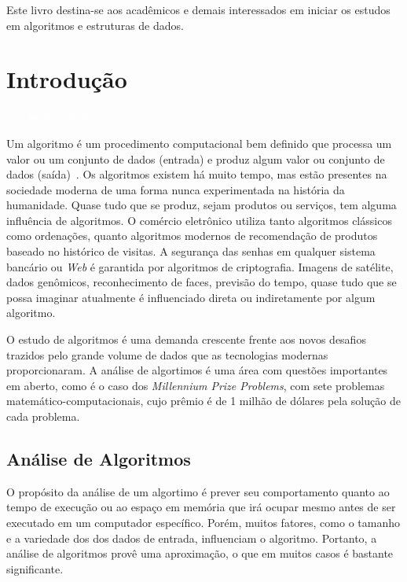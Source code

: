 \documentclass[11pt,fleqn]{book} %
\begin{document}

Este livro destina-se aos acadêmicos e demais interessados em iniciar os estudos em algoritmos e estruturas de dados.

\chapter{Introdução}\label{introducao}
\vspace{6em}
\begin{flushright}
	\textit{\textcolor{white}{Um bonita citação...}}
\end{flushright}
\vspace{12em}

Um algoritmo é um procedimento computacional bem definido que processa um valor ou um conjunto de dados (entrada) e produz algum valor ou conjunto de dados (saída)~\cite{cormen2009}.
Os algoritmos existem há muito tempo, mas estão presentes na sociedade moderna de uma forma nunca experimentada na história da humanidade.
Quase tudo que se produz, sejam produtos ou serviços, tem alguma influência de algoritmos.
O comércio eletrônico utiliza tanto algoritmos clássicos como ordenações, quanto algoritmos modernos de recomendação de produtos baseado no histórico de visitas.
A segurança das senhas em qualquer sistema bancário ou \textit{Web} é garantida por algoritmos de criptografia.
Imagens de satélite, dados genômicos, reconhecimento de faces, previsão do tempo, quase tudo que se possa imaginar atualmente é influenciado direta ou indiretamente por algum algoritmo.

O estudo de algoritmos é uma demanda crescente frente aos novos desafios trazidos pelo grande volume de dados que as tecnologias modernas proporcionaram.
A análise de algortimos é uma área com questões importantes em aberto, como é o caso dos \textit{Millennium Prize Problems}, com sete problemas matemático-computacionais, cujo prêmio é de 1 milhão de dólares pela solução de cada problema.

\section{Análise de Algoritmos}\label{sec_analise}

O propósito da análise de um algortimo é prever seu comportamento quanto ao tempo de execução ou ao espaço em memória que irá ocupar mesmo antes de ser executado em um computador específico.
Porém, muitos fatores, como o tamanho e a variedade dos dos dados de entrada, influenciam o algoritmo.
Portanto, a análise de algoritmos provê uma aproximação, o que em muitos casos é bastante significante.
\end{document}

